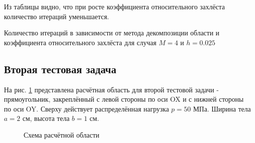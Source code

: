 \documentclass[a4paper]{article}
\begin{document}
Из таблицы видно, что при росте коэффициента относительного захлёста количество итераций уменьшается.

\begin{table}[h]
\caption{Количество итераций в зависимости от метода декомпозиции области и коэффициента относительного захлёста для случая $M = 4$ и $h = 0.025$}
\label{table:task_01_iters_overlap}
\end{table}

\newpage

\subsection{Вторая тестовая задача}

На рис. \ref{fig:task_02_scheme} представлена расчётная область для второй тестовой задачи - прямоугольник, закреплённый с левой стороны по оси OX и с нижней стороны по оси OY. Сверху действует распределённая нагрузка $p = 50$ МПа. Ширина тела $a = 2$ см, высота тела $b = 1$ см.

\begin{figure}[h]
\caption{Схема расчётной области}
\label{fig:task_02_scheme}
\end{figure}
\end{document}
